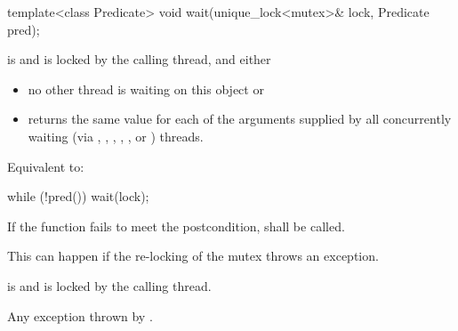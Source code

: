%
\begin{itemdecl}
template<class Predicate>
  void wait(unique_lock<mutex>& lock, Predicate pred);
\end{itemdecl}
\begin{itemdescr}
 \pnum \requires {} is  and  is
        locked by the calling thread, and either

        \begin{itemize}
         \item no other thread is waiting on this  object or
         \item {} returns the same value for each of the 
                arguments supplied by all concurrently waiting (via ,
                , ,
                {\color{insertcolor} , , or }) threads.
        \end{itemize}

 \pnum \effects Equivalent to:
\begin{codeblock}
while (!pred())
  wait(lock);
\end{codeblock}

 \pnum \remarks
        If the function fails to meet the postcondition, 
        shall be called.
        \begin{note} This can happen if the re-locking of the mutex throws an exception. \end{note}

 \pnum \postconditions {} is  and 
        is locked by the calling thread.

 \pnum \throws Any exception thrown by .
\end{itemdescr}


